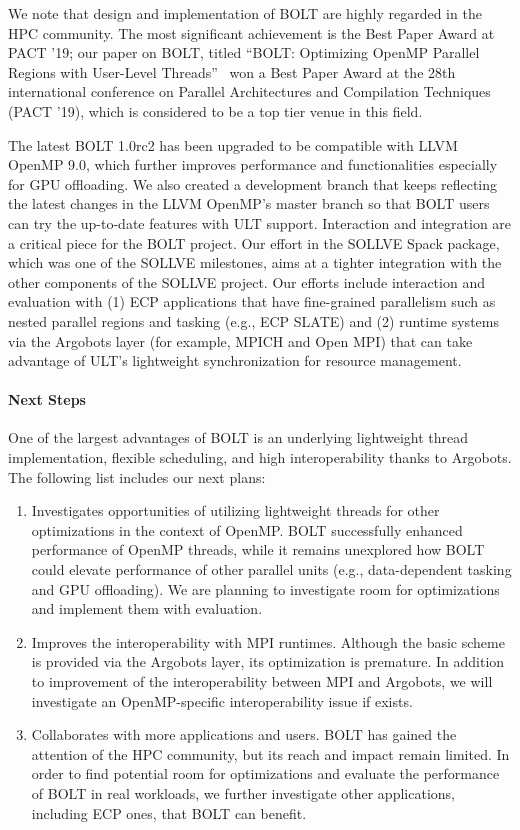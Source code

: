 We note that design and implementation of BOLT are highly regarded in
the HPC community. The most significant achievement is the Best Paper
Award at PACT '19; our paper on BOLT, titled ``BOLT: Optimizing OpenMP
Parallel Regions with User-Level Threads''~\cite{BOLT} won a Best
Paper Award at the 28th international conference on Parallel
Architectures and Compilation Techniques (PACT '19), which is
considered to be a top tier venue in this field.

The latest BOLT 1.0rc2 has been upgraded to be compatible with LLVM
OpenMP 9.0, which further improves performance and functionalities
especially for GPU offloading. We also created a development branch
that keeps reflecting the latest changes in the LLVM OpenMP's master
branch so that BOLT users can try the up-to-date features with ULT
support. Interaction and integration are a critical piece for the BOLT
project. Our effort in the SOLLVE Spack package, which was one of the
SOLLVE milestones, aims at a tighter integration with the other
components of the SOLLVE project. Our efforts include interaction and
evaluation with (1) ECP applications that have fine-grained
parallelism such as nested parallel regions and tasking (e.g., ECP
SLATE) and (2) runtime systems via the Argobots layer (for example,
MPICH and Open MPI) that can take advantage of ULT's lightweight
synchronization for resource management.

\paragraph{Next Steps}

One of the largest advantages of BOLT is an underlying lightweight
thread implementation, flexible scheduling, and high interoperability
thanks to Argobots. The following list includes our next plans:

\begin{enumerate}

\item Investigates opportunities of utilizing lightweight threads for
other optimizations in the context of OpenMP. BOLT successfully
enhanced performance of OpenMP threads, while it remains unexplored
how BOLT could elevate performance of other parallel units (e.g.,
data-dependent tasking and GPU offloading). We are planning to
investigate room for optimizations and implement them with
evaluation.

\item Improves the interoperability with MPI runtimes. Although the
basic scheme is provided via the Argobots layer, its optimization is
premature. In addition to improvement of the interoperability between
MPI and Argobots, we will investigate an OpenMP-specific
interoperability issue if exists.

\item Collaborates with more applications and users. BOLT has gained
the attention of the HPC community, but its reach and impact remain
limited. In order to find potential room for optimizations and
evaluate the performance of BOLT in real workloads, we further
investigate other applications, including ECP ones, that BOLT can
benefit.

\end{enumerate}
